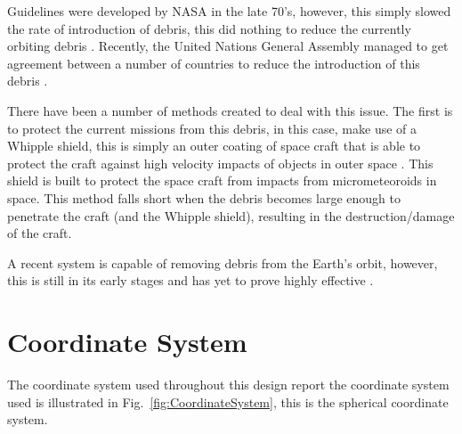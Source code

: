 \documentclass[11pt]{witseiepaper}
\begin{document}
\begin{bibunit}[witseie]
Guidelines were developed by NASA in the late 70's, however, this simply slowed the rate of introduction of debris, this did nothing to reduce the currently orbiting debris \cite{spaceDebrisGuide}. Recently, the United Nations General Assembly managed to get agreement between a number of countries to reduce the introduction of this debris \cite{debrisGuidelinesAgreement}.

There have been a number of methods created to deal with this issue. The first is to protect the current missions from this debris, in this case, make use of a Whipple shield, this is simply an outer coating of space craft that is able to protect the craft against high velocity impacts of objects in outer space \cite{Whipple}. This shield is built to protect the space craft from impacts from micrometeoroids in space.
This method falls short when the debris becomes large enough to penetrate the craft (and the Whipple shield), resulting in the destruction/damage of the craft.

A recent system is capable of removing debris from the Earth's orbit, however, this is still in its early stages and has yet to prove highly effective \cite{removalSpaceDebris}.

\section{Coordinate System} \label{sec:CoordinateSystem}
The coordinate system used throughout this design report the coordinate system used is illustrated in Fig.~\ref{fig:CoordinateSystem}, this is the spherical coordinate system.
\begin{figure}
    \centering



\end{figure}
\end{bibunit}
\end{document}
